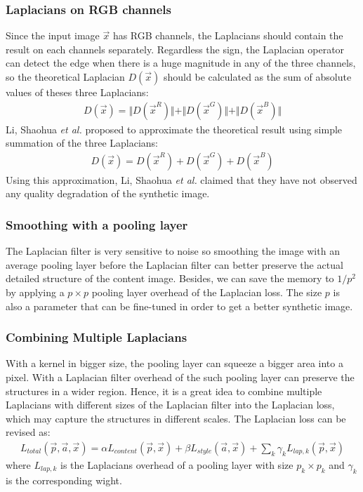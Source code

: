 \documentclass[runningheads]{llncs}
\begin{document}
\subsubsection{Laplacians on RGB channels}
Since the input image $\vec{x}$ has RGB channels, the Laplacians should contain the result on each channels separately. Regardless the sign, the Laplacian operator can detect the edge when there is a huge magnitude in any of the three channels, so the theoretical Laplacian $D(\vec{x})$ should be calculated as the sum of absolute values of theses three Laplacians:
\begin{align}
    D(\vec{x}) = \Vert D(\vec{x}^R)\Vert +\Vert D(\vec{x}^G)\Vert +\Vert D(\vec{x}^B)\Vert 
\end{align}
Li, Shaohua \textit{et al.}\cite{LiShaohua2017LNST} proposed to approximate the theoretical result using simple summation of the three Laplacians:
\begin{align}
    D(\vec{x}) =  D(\vec{x}^R)+D(\vec{x}^G)+ D(\vec{x}^B)
\end{align}
Using this approximation, Li, Shaohua \textit{et al.} claimed that they have not observed any quality degradation of the synthetic image.

\subsubsection{Smoothing with a pooling layer}
The Laplacian filter is very sensitive to noise so smoothing the image with an average pooling layer before the Laplacian filter can better preserve the actual detailed structure of the content image. Besides, we can save the memory to $1/p^2$ by applying a $p\times p$ pooling layer overhead of the Laplacian loss. The size $p$ is also a parameter that can be fine-tuned in order to get a better synthetic image. 

\subsubsection{Combining Multiple Laplacians}
With a kernel in bigger size, the pooling layer can squeeze a bigger area into a pixel. With a Laplacian filter overhead of the such pooling layer can preserve the structures in a wider region. Hence, it is a great idea to combine multiple Laplacians with different sizes of the Laplacian filter into the Laplacian loss, which may capture the structures in different scales. The Laplacian loss can be revised as:
\begin{align}
    L_{total}(\vec{p},\vec{a},\vec{x})=\alpha L_{content}(\vec{p},\vec{x})+\beta L_{style}(\vec{a},\vec{x})+\sum_{k} \gamma_{k} L_{lap,k}(\vec{p},\vec{x})
\end{align}
where $L_{lap,k}$ is the Laplacians overhead of a pooling layer with size $p_k \times p_k$ and $\gamma_k$ is the corresponding wight.
\end{document}

